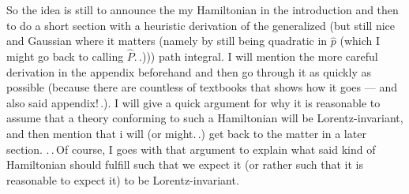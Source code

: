 \documentclass{report}
\begin{document}
So the idea is still to announce the my Hamiltonian in the introduction and then to do a short section with a heuristic derivation of the generalized (but still nice and Gaussian where it matters (namely by still being quadratic in $\hat p$ (which I might go back to calling $\hat P$.\,.))) path integral. I will mention the more careful derivation in the appendix beforehand and then go through it as quickly as possible (because there are countless of textbooks that shows how it goes --- and also said appendix!\,.). I will give a quick argument for why it is reasonable to assume that a theory conforming to such a Hamiltonian will be Lorentz-invariant, and then mention that i will (or might.\,.) get back to the matter in a later section. .\,.\,Of course, I goes with that argument to explain what said kind of Hamiltonian should fulfill such that we expect it (or rather such that it is reasonable to expect it) to be Lorentz-invariant. 
\end{document}
